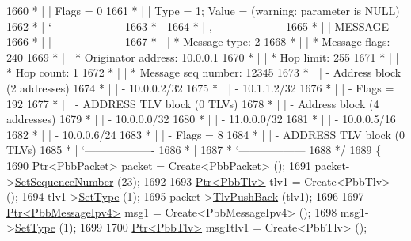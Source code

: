 \begin{DoxyCode}
1660 \textcolor{comment}{         * |    |         Flags = 0}
1661 \textcolor{comment}{         * |    |         Type = 1; Value = (warning: parameter is NULL)}
1662 \textcolor{comment}{         * |    `-------------------}
1663 \textcolor{comment}{         * |}
1664 \textcolor{comment}{         * |    ,-------------------}
1665 \textcolor{comment}{         * |    |  MESSAGE}
1666 \textcolor{comment}{         * |    |-------------------}
1667 \textcolor{comment}{         * |    | * Message type:       2}
1668 \textcolor{comment}{         * |    | * Message flags:  240}
1669 \textcolor{comment}{         * |    | * Originator address: 10.0.0.1}
1670 \textcolor{comment}{         * |    | * Hop limit:          255}
1671 \textcolor{comment}{         * |    | * Hop count:          1}
1672 \textcolor{comment}{         * |    | * Message seq number: 12345}
1673 \textcolor{comment}{         * |    | - Address block (2 addresses)}
1674 \textcolor{comment}{         * |    |     - 10.0.0.2/32}
1675 \textcolor{comment}{         * |    |     - 10.1.1.2/32}
1676 \textcolor{comment}{         * |    |     - Flags = 192}
1677 \textcolor{comment}{         * |    | - ADDRESS TLV block (0 TLVs)}
1678 \textcolor{comment}{         * |    | - Address block (4 addresses)}
1679 \textcolor{comment}{         * |    |     - 10.0.0.0/32}
1680 \textcolor{comment}{         * |    |     - 11.0.0.0/32}
1681 \textcolor{comment}{         * |    |     - 10.0.0.5/16}
1682 \textcolor{comment}{         * |    |     - 10.0.0.6/24}
1683 \textcolor{comment}{         * |    |     - Flags = 8}
1684 \textcolor{comment}{         * |    | - ADDRESS TLV block (0 TLVs)}
1685 \textcolor{comment}{         * |    `-------------------}
1686 \textcolor{comment}{         * |}
1687 \textcolor{comment}{         * `------------------}
1688 \textcolor{comment}{   */}
1689   \{
1690     \hyperlink{classns3_1_1Ptr}{Ptr<PbbPacket>} packet = Create<PbbPacket> ();
1691     packet->\hyperlink{classns3_1_1PbbPacket_a7d6a1602be86109760d0f26ff9bbbb8e}{SetSequenceNumber} (23);
1692 
1693     \hyperlink{classns3_1_1Ptr}{Ptr<PbbTlv>} tlv1 = Create<PbbTlv> ();
1694     tlv1->\hyperlink{classns3_1_1PbbTlv_a90a0452018ed364ac37c3ad116dd718b}{SetType} (1);
1695     packet->\hyperlink{classns3_1_1PbbPacket_a34935793e729a106c176db99c969cb42}{TlvPushBack} (tlv1);
1696 
1697     \hyperlink{classns3_1_1Ptr}{Ptr<PbbMessageIpv4>} msg1 = Create<PbbMessageIpv4> ();
1698     msg1->\hyperlink{classns3_1_1PbbMessage_a4b3d1eaabd3e7412a46ac79bf3360dac}{SetType} (1);
1699 
1700     \hyperlink{classns3_1_1Ptr}{Ptr<PbbTlv>} msg1tlv1 = Create<PbbTlv> ();

\end{DoxyCode}
